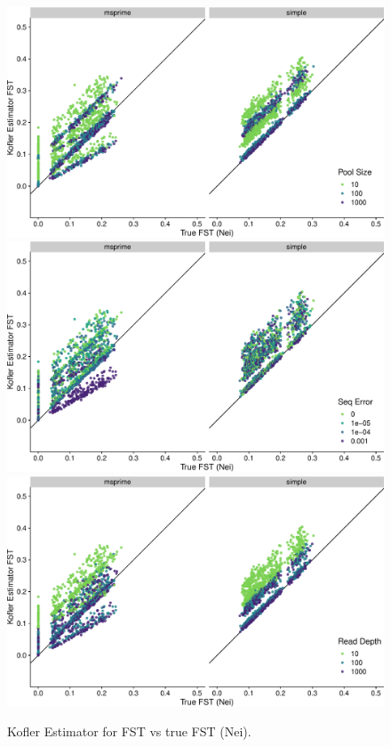 \documentclass[a4paper,fontsize=9pt,DIV=14]{scrartcl}
\begin{document}
\begin{figure}[p]
    \centering
    \includegraphics[width=.75\linewidth]{true_nei_fst-est_kofler-pool_size.pdf}
    \includegraphics[width=.75\linewidth]{true_nei_fst-est_kofler-seq_error.pdf}
    \includegraphics[width=.75\linewidth]{true_nei_fst-est_kofler-read_depth.pdf}
    \vspace*{-1em}
    \caption{
        Kofler Estimator for FST vs true FST (Nei).
    }
\label{fig:Kofler}
\end{figure}
\end{document}
